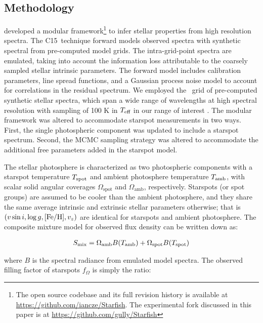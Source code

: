 \documentclass[twocolumn]{emulateapj}%
\newcommand{\iancze}{{\sc C15}}
\begin{document}
\subsection{Methodology}\label{sec:methods} 

\citet[hereafter \iancze]{czekala15} developed a modular framework\footnote{The open source codebase and its full revision history is available at \url{https://github.com/iancze/Starfish}.  The experimental fork discussed in this paper is at \url{https://github.com/gully/Starfish}} to infer stellar properties from high resolution spectra.  The \iancze\ technique forward models observed spectra with synthetic spectral from pre-computed model grids.  The intra-grid-point spectra are emulated, taking into account the information loss attributable to the coarsely sampled stellar intrinsic parameters.  The forward model includes calibration parameters, line spread functions, and a Gaussian process noise model to account for correlations in the residual spectrum.  We employed the \PHOENIX\ grid of pre-computed synthetic stellar spectra, which span a wide range of wavelengths at high spectral resolution with sampling of 100 K in $T_\textrm{eff}$ in our range of interest \citep{husser13}.  The modular framework was altered to accommodate starspot measurements in two ways. First, the single photospheric component was updated to include a starspot spectrum. Second, the MCMC sampling strategy was altered to accommodate the additional free parameters added in the starspot model.

The stellar photosphere is characterized as two photospheric components with a starspot temperature $T_\textrm{spot}$ and ambient photosphere temperature $T_\textrm{amb}$, with scalar solid angular coverages $\Omega_{\mathrm{spot}}$ and $\Omega_{\mathrm{amb}}$, respectively.    Starspots (or spot groups) are assumed to be cooler than the ambient photosphere, and they share the same average intrinsic and extrinsic stellar parameters otherwise; that is $(v \sin i, \log g, [{\rm Fe}/{\rm H}], v_z)$ are identical for starspots and ambient photosphere.  The composite mixture model for observed flux density can be written down as:

\begin{eqnarray} \label{eqn:mix_M}
S_{\mathrm{mix}} = \Omega_{\mathrm{amb}} B(T_\textrm{amb})  + \Omega_{\mathrm{spot}} B(T_\textrm{spot})
\end{eqnarray}

where $B$ is the spectral radiance from emulated model spectra.  The observed filling factor of starspots $f_{\Omega}$ is simply the ratio:
\end{document}
